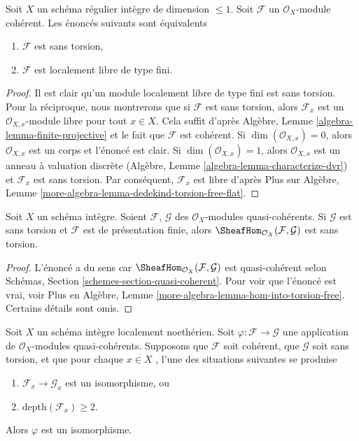 \begin{lemma}
\label{lemma-torsion-free-over-regular-dim-1}
Soit  $X$  un schéma régulier intègre de dimension  $\leq 1$. Soit
 $\mathcal{F}$  un  $\mathcal{O}_X$-module cohérent. Les énoncés suivants sont
équivalents
\begin{enumerate}
\item $\mathcal{F}$  est sans torsion,
\item $\mathcal{F}$  est localement libre de type fini.
\end{enumerate}
\end{lemma}

\begin{proof}
Il est clair qu'un module localement libre de type fini est sans torsion. Pour la
réciproque, nous montrerons que si  $\mathcal{F}$  est sans torsion, alors
 $\mathcal{F}_x$  est un  $\mathcal{O}_{X, x}$-module libre pour tout  $x \in X$. Cela suffit
d'après Algèbre, Lemme  \ref{algebra-lemma-finite-projective}  et le fait que  $\mathcal{F}$  est cohérent. Si
 $\dim(\mathcal{O}_{X, x}) = 0$, alors  $\mathcal{O}_{X, x}$  est un corps et l'énoncé est clair. Si
 $\dim(\mathcal{O}_{X, x}) = 1$, alors  $\mathcal{O}_{X, x}$  est un anneau à valuation discrète (Algèbre,
Lemme  \ref{algebra-lemma-characterize-dvr}) et  $\mathcal{F}_x$  est sans torsion. Par conséquent,  $\mathcal{F}_x$ 
est libre d'après Plus sur Algèbre, Lemme  \ref{more-algebra-lemma-dedekind-torsion-free-flat}.
\end{proof}

\begin{lemma}
\label{lemma-hom-into-torsion-free}
Soit  $X$  un schéma intègre. Soient  $\mathcal{F}$,  $\mathcal{G}$  des
 $\mathcal{O}_X$-modules quasi-cohérents. Si  $\mathcal{G}$  est sans torsion et
 $\mathcal{F}$  est de présentation finie, alors  $\SheafHom_{\mathcal{O}_X}(\mathcal{F}, \mathcal{G})$  est sans torsion.
\end{lemma}

\begin{proof}
L'énoncé a du sens car  $\SheafHom_{\mathcal{O}_X}(\mathcal{F}, \mathcal{G})$  est quasi-cohérent selon Schémas, Section
 \ref{schemes-section-quasi-coherent}. Pour voir que l'énoncé est vrai, voir Plus en Algèbre, Lemme
 \ref{more-algebra-lemma-hom-into-torsion-free}. Certains détails sont omis.
\end{proof}

\begin{lemma}
\label{lemma-isom-depth-2-torsion-free}
Soit  $X$  un schéma intègre localement noethérien. Soit  $\varphi : \mathcal{F} \to \mathcal{G}$  une
application de  $\mathcal{O}_X$-modules quasi-cohérents. Supposons que  $\mathcal{F}$ 
soit cohérent, que  $\mathcal{G}$  soit sans torsion, et que pour chaque
 $x \in X$ , l'une des situations suivantes se produise
\begin{enumerate}
\item $\mathcal{F}_x \to \mathcal{G}_x$  est un isomorphisme, ou
\item $\text{depth}(\mathcal{F}_x) \geq 2$.
\end{enumerate}
Alors  $\varphi$  est un isomorphisme.
\end{lemma}

